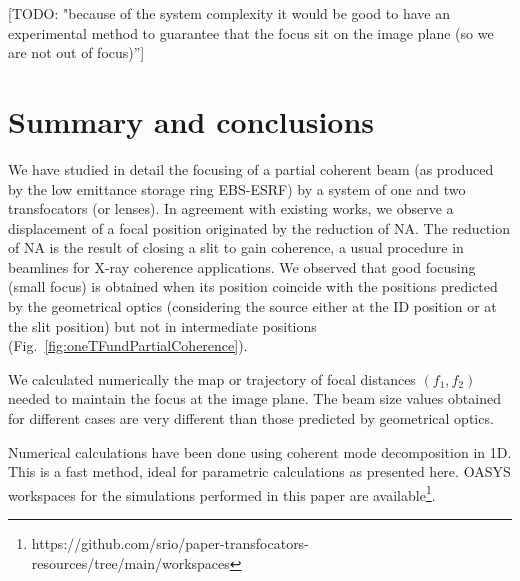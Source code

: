 \documentclass{iucr}              %
\newcommand{\todo}[1]{{\color{red}[TODO: "#1'']}}
\begin{document}
\todo{because of the system complexity it would be good to have an experimental method to guarantee that the focus sit on the image plane (so we are not out of focus)}



\section{Summary and conclusions}
\label{sec:summary}

We have studied in detail the focusing of a partial coherent beam (as produced by the low emittance storage ring EBS-ESRF) by a system of one and two transfocators (or lenses). In agreement with existing works, we observe a displacement of a focal position originated by the reduction of NA. The reduction of NA is the result of closing a slit to gain coherence, a usual procedure in beamlines for X-ray coherence applications. We observed that good focusing (small focus) is obtained when its position coincide with the positions predicted by the geometrical optics (considering the source either at the ID position or at the slit position) but not in intermediate positions (Fig.~\ref{fig:oneTFundPartialCoherence}).

We calculated numerically the map or trajectory of focal distances $(f_1,f_2)$ needed to maintain the focus at the image plane. The beam size values obtained for different cases are very different than those predicted by geometrical optics.  

Numerical calculations have been done using coherent mode decomposition in 1D. This is a fast method, ideal for parametric calculations as presented here. OASYS workspaces for the simulations performed in this paper are available\footnote{{ https://github.com/srio/paper-transfocators-resources/tree/main/workspaces}}.






\end{document}
